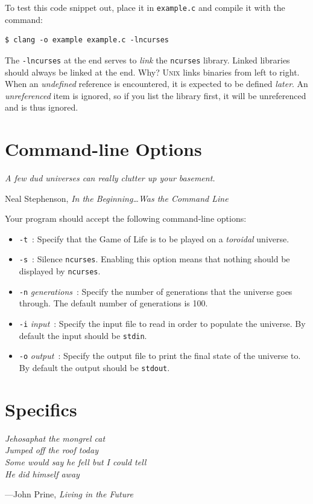 \documentclass[11pt]{article}
\begin{document}
To test this code snippet out, place it in \texttt{example.c} and compile it
with the command:

\begin{lstlisting}[style=bashstyle]
  $ clang -o example example.c -lncurses
\end{lstlisting}

The \texttt{-lncurses} at the end serves to \emph{link} the \texttt{ncurses}
library. Linked libraries should always be linked at the end. Why? \textsc{Unix}
links binaries from left to right. When an \emph{undefined} reference is
encountered, it is expected to be defined \emph{later}. An \emph{unreferenced} item is
ignored, so if you list the library first, it will be unreferenced and is thus
ignored.


\section{Command-line Options}
\textwidth
\epigraph{\emph{A few dud universes can really clutter up your basement.}}{Neal Stephenson, \emph{In the Beginning\ldots Was the Command Line}}

Your program should accept the following command-line options:

\begin{itemize}
  \item \texttt{-t}\ : Specify that the Game of Life is to be played on a \emph{toroidal}
    universe.
  \item \texttt{-s}\ : Silence \texttt{ncurses}. Enabling this option means
    that nothing should be displayed by \texttt{ncurses}.
  \item \texttt{-n} \emph{generations}\ : Specify the number of generations that the
    universe goes through. The default number of generations is 100.
  \item \texttt{-i} \emph{input}\ : Specify the input file to read in order to populate
    the universe. By default the input should be \texttt{stdin}.
  \item \texttt{-o} \emph{output}\ : Specify the output file to print the final state
    of the universe to. By default the output should be \texttt{stdout}.
\end{itemize}


\section{Specifics}
\textwidth
\epigraph{\emph{Jehosaphat the mongrel cat \\
Jumped off the roof today \\
Some would say he fell but I could tell \\
He did himself away}}{---John Prine, \emph{Living in the Future}}
\end{document}
